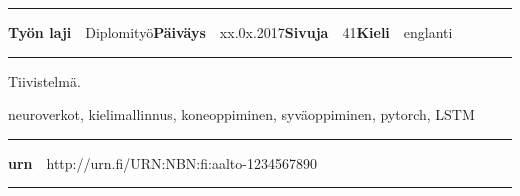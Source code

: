 \begin{spacing}{.88}
{\vspace{-2.4mm}\rule{\textwidth}{.75pt}

{\fontsize{10.5pt}{10.5pt}\bfseries\sffamily\lsstyle Työn laji}~~{\small Diplomityö}\hfill{\fontsize{10.5pt}{10.5pt}\bfseries\sffamily\lsstyle Päiväys}~~{\small xx.0x.2017}\hfill{\fontsize{10.5pt}{10.5pt}\bfseries\sffamily\lsstyle Sivuja}~~{41}\hfill{\fontsize{10.5pt}{10.5pt}\bfseries\sffamily\lsstyle Kieli}~~{\small englanti}

\vspace{-2.4mm}\rule{\textwidth}{.75pt}

\vspace{6mm}

} %
\end{spacing}
\begin{spacing}{1.05}

\vspace{.8mm}

{\small
  Tiivistelmä.
}

\vfill

\end{spacing}
\begin{spacing}{.88}
{\parindent0pt %

\parbox[t]{121.6mm}{\raggedright\small neuroverkot, kielimallinnus, koneoppiminen, syväoppiminen, pytorch, LSTM}

\vspace{.5mm}\rule{\textwidth}{.75pt}

{\fontsize{10.5pt}{10.5pt}\bfseries\sffamily\lsstyle urn}~~{\small http://urn.fi/URN:NBN:fi:aalto-1234567890}

\vspace{-2.4mm}\rule{\textwidth}{.75pt}

} %
\end{spacing}

\restoregeometry  %




\newpage

\tableofcontents


